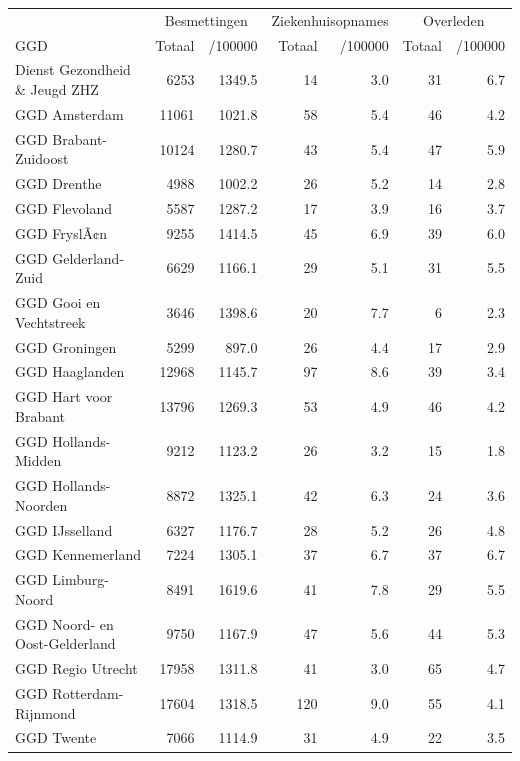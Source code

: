 \documentclass[
  english,
  man,floatsintext]{apa6}
\begin{document}
\begin{table}
\centering\begingroup\fontsize{10}{12}\selectfont

\begin{threeparttable}
\begin{tabular}{lrrrrrr}
\toprule
\multicolumn{1}{c}{ } & \multicolumn{2}{c}{Besmettingen} & \multicolumn{2}{c}{Ziekenhuisopnames} & \multicolumn{2}{c}{Overleden} \\
\cmidrule(l{3pt}r{3pt}){2-3} \cmidrule(l{3pt}r{3pt}){4-5} \cmidrule(l{3pt}r{3pt}){6-7}
GGD & Totaal & /100000 & Totaal & /100000 & Totaal & /100000\\
\midrule
Dienst Gezondheid \& Jeugd ZHZ & 6253 & 1349.5 & 14 & 3.0 & 31 & 6.7\\
GGD Amsterdam & 11061 & 1021.8 & 58 & 5.4 & 46 & 4.2\\
GGD Brabant-Zuidoost & 10124 & 1280.7 & 43 & 5.4 & 47 & 5.9\\
GGD Drenthe & 4988 & 1002.2 & 26 & 5.2 & 14 & 2.8\\
GGD Flevoland & 5587 & 1287.2 & 17 & 3.9 & 16 & 3.7\\
GGD FryslÃ¢n & 9255 & 1414.5 & 45 & 6.9 & 39 & 6.0\\
GGD Gelderland-Zuid & 6629 & 1166.1 & 29 & 5.1 & 31 & 5.5\\
GGD Gooi en Vechtstreek & 3646 & 1398.6 & 20 & 7.7 & 6 & 2.3\\
GGD Groningen & 5299 & 897.0 & 26 & 4.4 & 17 & 2.9\\
GGD Haaglanden & 12968 & 1145.7 & 97 & 8.6 & 39 & 3.4\\
GGD Hart voor Brabant & 13796 & 1269.3 & 53 & 4.9 & 46 & 4.2\\
GGD Hollands-Midden & 9212 & 1123.2 & 26 & 3.2 & 15 & 1.8\\
GGD Hollands-Noorden & 8872 & 1325.1 & 42 & 6.3 & 24 & 3.6\\
GGD IJsselland & 6327 & 1176.7 & 28 & 5.2 & 26 & 4.8\\
GGD Kennemerland & 7224 & 1305.1 & 37 & 6.7 & 37 & 6.7\\
GGD Limburg-Noord & 8491 & 1619.6 & 41 & 7.8 & 29 & 5.5\\
GGD Noord- en Oost-Gelderland & 9750 & 1167.9 & 47 & 5.6 & 44 & 5.3\\
GGD Regio Utrecht & 17958 & 1311.8 & 41 & 3.0 & 65 & 4.7\\
GGD Rotterdam-Rijnmond & 17604 & 1318.5 & 120 & 9.0 & 55 & 4.1\\
GGD Twente & 7066 & 1114.9 & 31 & 4.9 & 22 & 3.5\\

\end{tabular}
\end{threeparttable}
\end{table}
\end{document}

